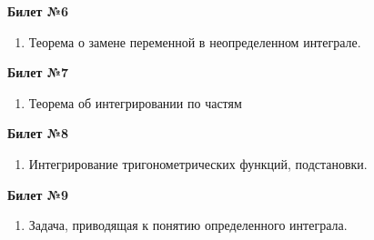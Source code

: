 \documentclass[a4paper, 12pt]{article}
\begin{document}
\begin{center}
	\textbf{Билет №6}
\end{center}
\begin{enumerate}
	\item Теорема о замене переменной в неопределенном интеграле.
\end{enumerate}

\begin{center}
	\textbf{Билет №7}
\end{center}
\begin{enumerate}
	\item Теорема об интегрировании по частям 
\end{enumerate}

\begin{center}
	\textbf{Билет №8}
\end{center}
\begin{enumerate}
	\item Интегрирование тригонометрических функций, подстановки.
\end{enumerate}

\begin{center}
	\textbf{Билет №9}
\end{center}
\begin{enumerate}
	\item Задача, приводящая к понятию определенного интеграла.
\end{enumerate}
\end{document}
